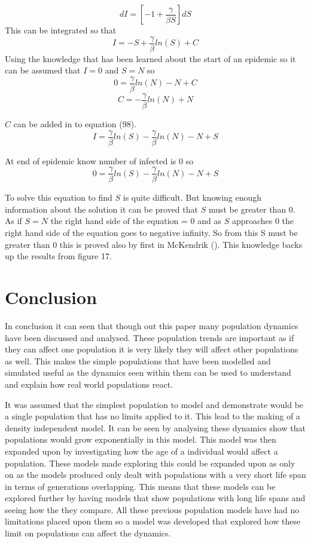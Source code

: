 \documentclass[final]{cmpreport}
\begin{document}
	\begin{equation}dI= [-1 + \frac{\gamma}{\beta S}]dS	\end{equation}
	This can be integrated so that 
	\begin{equation}I= -S + \frac{\gamma}{\beta }ln(S)+C	\end{equation}
	Using the knowledge that has been learned  about the start of an epidemic so it can be assumed that $I=0$ and $S=N$ so 
	\begin{equation}0= \frac{\gamma}{\beta }ln(N)-N+C\end{equation}
	\begin{equation} C=-\frac{\gamma}{\beta }ln(N)+N \end{equation}
	
	$C$ can be added in to equation (98).
	\begin{equation}I= \frac{\gamma}{\beta }ln(S)-\frac{\gamma}{\beta }ln(N)-N+S\end{equation}
	
	At end of epidemic know number of infected is 0 so
	\begin{equation}0= \frac{\gamma}{\beta }ln(S)-\frac{\gamma}{\beta }ln(N)-N+S\end{equation}
	
	To solve this equation to find $S$ is quite difficult. But knowing enough information about the solution it can be proved that $S$ must be greater than 0. As if $S=N$ the right hand side of the equation = 0 and as $S$ approaches 0 the right hand side of the equation goes to negative infinity. So from this S must be greater than 0 this is proved also by first in McKendrik (\cite{Kermack700}). This knowledge backs up the results from figure 17.
	
	\section{Conclusion}
	In conclusion it can seen that though out this paper many population dynamics have been discussed and analysed. These population trends are important as if they can affect one population it is very likely they will affect other populations as well. This makes the simple populations that have been modelled and simulated useful as the dynamics seen within them can be used to understand and explain how real world populations react.
	
	It was assumed that the simplest population to model and demonstrate would be a single population that has no limits applied to it. This lead to the making of a density independent model. It can be seen by analysing  these dynamics show that populations would grow exponentially in this model. This model was then expanded upon by investigating how the age of a individual  would affect a population. These models made exploring this could be expanded upon as only on as the models produced only dealt with populations with a very short life span in terms of generations overlapping. This means that these models can be explored further by having models that show populations with long life spans and seeing how the they compare. All these previous population models have had no limitations placed upon them so a model was developed that explored how these limit on populations can affect the dynamics.
	
\end{document}
